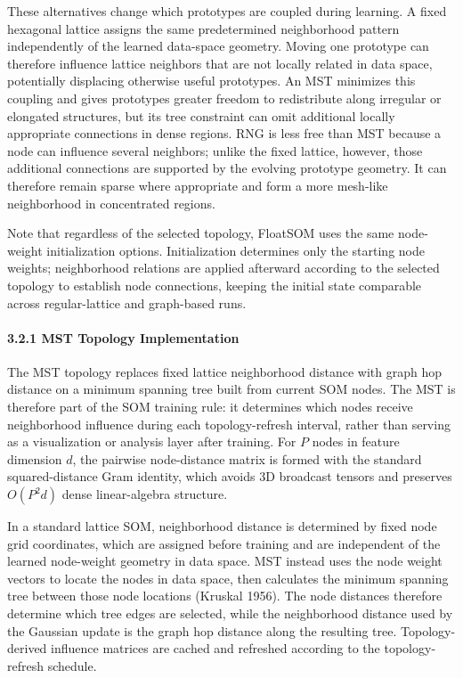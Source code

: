 \documentclass[
]{article}
\providecommand{\DIFadd}[1]{{\protect\color{blue} #1}} %
\providecommand{\DIFaddbegin}{} %
\providecommand{\DIFaddend}{} %
\begin{document}
\DIFaddbegin \DIFadd{These alternatives change which prototypes are coupled during learning.
A fixed hexagonal lattice assigns the same predetermined neighborhood
pattern independently of the learned data-space geometry. Moving one
prototype can therefore influence lattice neighbors that are not locally
related in data space, potentially displacing otherwise useful
prototypes. An MST minimizes this coupling and gives prototypes greater
freedom to redistribute along irregular or elongated structures, but its
tree constraint can omit additional locally appropriate connections in
dense regions. RNG is less free than MST because a node can influence
several neighbors; unlike the fixed lattice, however, those additional
connections are supported by the evolving prototype geometry. It can
therefore remain sparse where appropriate and form a more mesh-like
neighborhood in concentrated regions.
}

\DIFaddend Note that regardless of the selected topology, FloatSOM uses the same
node-weight initialization options. Initialization determines only the
starting node weights; neighborhood relations are applied afterward
according to the selected topology to establish node connections,
keeping the initial state comparable across regular-lattice and
graph-based runs.

\paragraph{3.2.1 MST Topology
Implementation}\label{mst-topology-implementation}

The MST topology replaces fixed lattice neighborhood distance with graph
hop distance on a minimum spanning tree built from current SOM nodes.
\DIFaddbegin \DIFadd{The MST is therefore part of the SOM training rule: it determines which
nodes receive neighborhood influence during each topology-refresh
interval, rather than serving as a visualization or analysis layer after
training. }\DIFaddend For \(P\) nodes in feature dimension \(d\), the pairwise
node-distance matrix is formed with the standard squared-distance Gram
identity, which avoids 3D broadcast tensors and preserves \(O(P^2 d)\)
dense linear-algebra structure.

In a standard lattice SOM, neighborhood distance is determined by fixed
node grid coordinates, which are assigned before training and are
independent of the learned node-weight geometry in data space. MST
instead uses the node weight vectors to locate the nodes in data space,
then calculates the minimum spanning tree between those node locations
(Kruskal 1956). The node distances therefore determine which tree edges
are selected, while the neighborhood distance used by the Gaussian
update is the graph hop distance along the resulting tree.
Topology-derived influence matrices are cached and refreshed according
to the topology-refresh schedule.
\end{document}
